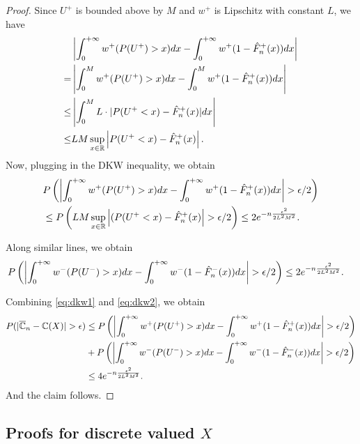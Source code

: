 \documentclass{article}
\numberwithin{equation}{section}
\numberwithin{theorem}{section}
\begin{document}
\begin{proof}
Since $U^+$ is bounded above by $M$ and $w^+$ is Lipschitz with constant $L$, we have
\begin{align*}
&\left|\int_0^{+\infty} w^+(P(U^+)>x) dx- \int_0^{+\infty} w^+(1- {\hat F_n}^+(x)) dx\right|
\\
= & \left|\int_0^M w^+(P(U^+)>x) dx- \int_0^M w^+(1- {\hat F_n}^+(x)) dx\right|
\\
\leq&
\left|\int_0^M L\cdot |P(U^+<x)-{\hat F_n}^+(x)| dx\right|\\
\leq&
LM\sup_{x\in \mathbb{R}}\left|P(U^+<x)-{\hat F_n}^+(x)\right|.
\end{align*}
Now, plugging in the DKW inequality, we obtain
\begin{align}
&
P\left(\left|\intinfinity w^+(P(U^+)>x) dx- \intinfinity w^+(1- {\hat F_n}^+(x)) dx\right|>\epsilon/2\right)
\nonumber\\
&
\leq
 P\left(LM\sup_{x\in \mathbb{R}} \left|(P(U^+<x)-{\hat F_n}^+(x)\right|>\epsilon/2\right) \leq 2 e^{-n \frac{\epsilon^2}{2 L^2 M^2}}.\label{eq:dkw1}
\end{align}

Along similar lines, we obtain
\begin{align}
&
P\left(\left|\intinfinity w^-(P(U^-)>x) dx- \intinfinity w^-(1- {\hat F_n}^-(x)) dx\right|>\epsilon/2\right)
 \leq 2 e^{-n \frac{\epsilon^2}{2 L^2 M^2}}.\label{eq:dkw2}
\end{align}

Combining \eqref{eq:dkw1} and \eqref{eq:dkw2}, we obtain
\begin{align*}
P(|\overline \C_n - \C(X)|>\epsilon) 
&\le P\left(\left|\intinfinity w^+(P(U^+)>x) dx- \intinfinity w^+(1- {\hat F_n}^+(x)) dx\right|>\epsilon/2\right) \\
&+ 
P\left(\left|\intinfinity w^-(P(U^-)>x) dx- \intinfinity w^-(1- {\hat F_n}^-(x)) dx\right|>\epsilon/2\right)\\
&\le 4 e^{-n \frac{\epsilon^2}{2 L^2 M^2}}.
\end{align*} 
And the claim follows. 
\end{proof}

\subsection{Proofs for discrete valued $X$}
\label{sec:proofs-discrete}


\end{document}
